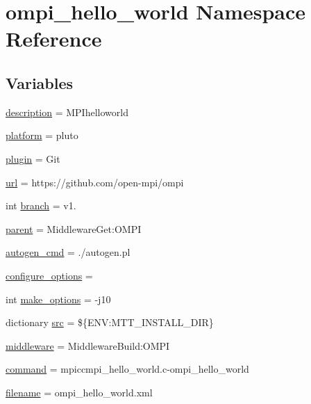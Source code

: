 \hypertarget{namespaceompi__hello__world}{\section{ompi\-\_\-hello\-\_\-world Namespace Reference}
\label{namespaceompi__hello__world}
}
\subsection*{Variables}
\begin{DoxyCompactItemize}
\item 
\hyperlink{namespaceompi__hello__world_a52b9c10821e333fe5c7413d414abeb1b}{description} = M\-P\-Ihelloworld
\item 
\hyperlink{namespaceompi__hello__world_af8ab2503d0ec334a65a72e930a24e713}{platform} = pluto
\item 
\hyperlink{namespaceompi__hello__world_a687eab84563b30840a200bfaf5407f51}{plugin} = Git
\item 
\hyperlink{namespaceompi__hello__world_ae0dcf6cc43abc8d11428686639a5059a}{url} = https\-://github.\-com/open-\/mpi/ompi
\item 
int \hyperlink{namespaceompi__hello__world_a34c1b9feb533b831fb7b0cd036494718}{branch} = v1.
\item 
\hyperlink{namespaceompi__hello__world_a5508612e06f3402554fdda7a9eca7d62}{parent} = Middleware\-Get\-:\-O\-M\-P\-I
\item 
\hyperlink{namespaceompi__hello__world_ab26bf3479d404017c9d0623f42e9dcd3}{autogen\-\_\-cmd} = ./autogen.\-pl
\item 
\hyperlink{namespaceompi__hello__world_a7b6bd890daea8a06c3daea5019b415f1}{configure\-\_\-options} =
\item 
int \hyperlink{namespaceompi__hello__world_a3b1603e3acde68a17311cb93a6a5ef12}{make\-\_\-options} = -\/j10
\item 
dictionary \hyperlink{namespaceompi__hello__world_a88a2db81a1836d83ed41abd7d39c9c4e}{src} = \$\{E\-N\-V\-:\-M\-T\-T\-\_\-\-I\-N\-S\-T\-A\-L\-L\-\_\-\-D\-I\-R\}
\item 
\hyperlink{namespaceompi__hello__world_a64807561a94c3ff5b1c9a945e580f643}{middleware} = Middleware\-Build\-:\-O\-M\-P\-I
\item 
\hyperlink{namespaceompi__hello__world_aa34adcfe660e349e3d2d9f69eb9412bb}{command} = mpiccmpi\-\_\-hello\-\_\-world.\-c-\/ompi\-\_\-hello\-\_\-world
\item 
\hyperlink{namespaceompi__hello__world_ae42ce8011012447dba87c7337e9ddab8}{filename} = ompi\-\_\-hello\-\_\-world.\-xml
\end{DoxyCompactItemize}


